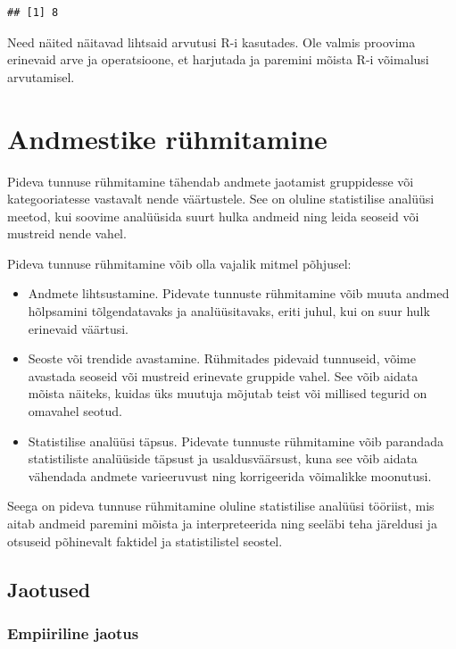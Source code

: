 \documentclass[
]{book}
\begin{document}
\begin{verbatim}
## [1] 8
\end{verbatim}

Need näited näitavad lihtsaid arvutusi R-i kasutades. Ole valmis proovima erinevaid arve ja operatsioone, et harjutada ja paremini mõista R-i võimalusi arvutamisel.

\chapter{Andmestike rühmitamine}\label{andmestike-ruxfchmitamine}

Pideva tunnuse rühmitamine tähendab andmete jaotamist gruppidesse või kategooriatesse vastavalt nende väärtustele. See on oluline statistilise analüüsi meetod, kui soovime analüüsida suurt hulka andmeid ning leida seoseid või mustreid nende vahel.

Pideva tunnuse rühmitamine võib olla vajalik mitmel põhjusel:

\begin{itemize}
\item
  Andmete lihtsustamine. Pidevate tunnuste rühmitamine võib muuta andmed hõlpsamini tõlgendatavaks ja analüüsitavaks, eriti juhul, kui on suur hulk erinevaid väärtusi.
\item
  Seoste või trendide avastamine. Rühmitades pidevaid tunnuseid, võime avastada seoseid või mustreid erinevate gruppide vahel. See võib aidata mõista näiteks, kuidas üks muutuja mõjutab teist või millised tegurid on omavahel seotud.
\item
  Statistilise analüüsi täpsus. Pidevate tunnuste rühmitamine võib parandada statistiliste analüüside täpsust ja usaldusväärsust, kuna see võib aidata vähendada andmete varieeruvust ning korrigeerida võimalikke moonutusi.
\end{itemize}

Seega on pideva tunnuse rühmitamine oluline statistilise analüüsi tööriist, mis aitab andmeid paremini mõista ja interpreteerida ning seeläbi teha järeldusi ja otsuseid põhinevalt faktidel ja statistilistel seostel.

\section{Jaotused}\label{jaotused}

\subsection{Empiiriline jaotus}\label{empiiriline-jaotus}
\end{document}
